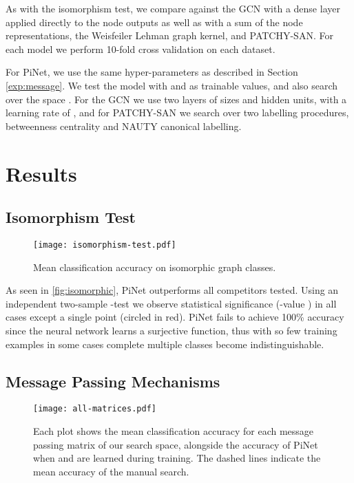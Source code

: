 \documentclass{article}
\theoremstyle{definition}
\begin{document}
As with the isomorphism test, we compare against the GCN with a dense layer applied directly to the node outputs as well as with a sum of the node representations, the Weisfeiler Lehman graph kernel, and PATCHY-SAN. For each model we perform 10-fold cross validation on each dataset.

For PiNet, we use the same hyper-parameters as described in Section \ref{exp:message}. We test the model with  and  as trainable values, and also search over the space . For the GCN we use two layers of sizes  and  hidden units, with a learning rate of , and for PATCHY-SAN we search over two labelling procedures, betweenness centrality \cite{Brandes2001} and NAUTY \cite{Mckay2013} canonical labelling.

\section{Results}

\subsection{Isomorphism Test}

\begin{figure}[ht]
  \centering
  \texttt{[image: isomorphism-test.pdf]}
  \caption{Mean classification accuracy on isomorphic graph classes.}
  \label{fig:isomorphic}
\end{figure}

As seen in \autoref{fig:isomorphic}, PiNet outperforms all competitors tested. Using an independent two-sample -test we observe statistical significance (-value ) in all cases except a single point (circled in red). PiNet fails to achieve 100\% accuracy since the neural network learns a surjective function, thus with so few training examples in some cases complete multiple classes become indistinguishable. 

\subsection{Message Passing Mechanisms}

\begin{figure}[ht]
  \centering
  \texttt{[image: all-matrices.pdf]}
  \caption{Each plot shows the mean classification accuracy for each message passing matrix of our search space, alongside the accuracy of PiNet when  and  are learned during training. The dashed lines indicate the mean accuracy of the manual search.}
  \label{fig:all_matrices}
\end{figure}
\end{document}
